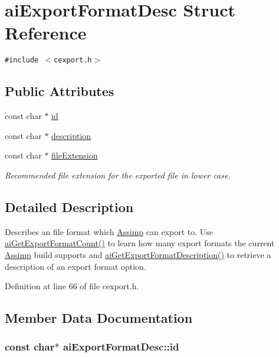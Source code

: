 \hypertarget{structai_export_format_desc}{
\section{aiExportFormatDesc Struct Reference}
\label{structai_export_format_desc}
}
{\tt \#include $<$cexport.h$>$}

\subsection*{Public Attributes}
\begin{CompactItemize}
\item 
const char $\ast$ \hyperlink{structai_export_format_desc_fe216eaea3a04abca041e5c253f94bbf}{id}
\item 
const char $\ast$ \hyperlink{structai_export_format_desc_9c84c4b07c5177fb6539b9bdf90236fb}{description}
\item 
\hypertarget{structai_export_format_desc_589d08d526f253176d09886787cd6b22}{
const char $\ast$ \hyperlink{structai_export_format_desc_589d08d526f253176d09886787cd6b22}{fileExtension}}
\label{structai_export_format_desc_589d08d526f253176d09886787cd6b22}

\begin{CompactList}\small\item\em Recommended file extension for the exported file in lower case. \item\end{CompactList}\end{CompactItemize}


\subsection{Detailed Description}
Describes an file format which \hyperlink{namespace_assimp}{Assimp} can export to. Use \hyperlink{cexport_8h_59cfffbc5b436da8ed8542108102b502}{aiGetExportFormatCount()} to learn how many export formats the current \hyperlink{namespace_assimp}{Assimp} build supports and \hyperlink{cexport_8h_dda7f2e6611f719af6c8a4a0bef0a0a2}{aiGetExportFormatDescription()} to retrieve a description of an export format option. 

Definition at line 66 of file cexport.h.

\subsection{Member Data Documentation}
\hypertarget{structai_export_format_desc_fe216eaea3a04abca041e5c253f94bbf}{
\subsubsection[id]{\setlength{\rightskip}{0pt plus 5cm}const char$\ast$ {\bf aiExportFormatDesc::id}}}
\label{structai_export_format_desc_fe216eaea3a04abca041e5c253f94bbf}


